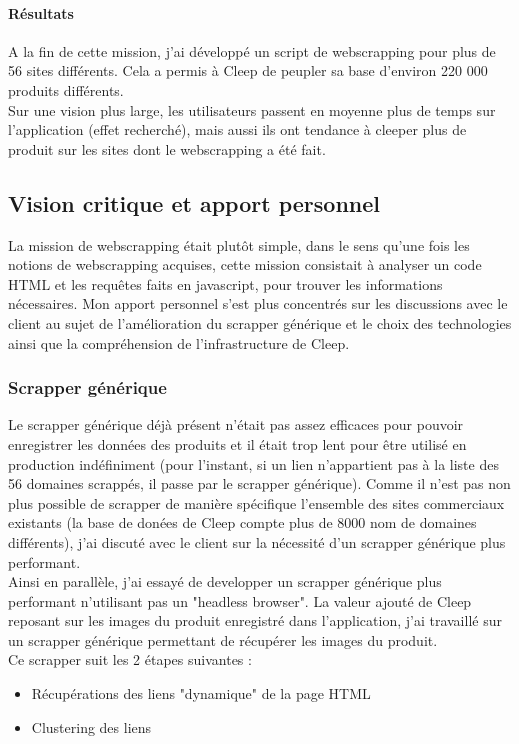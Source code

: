 \documentclass{article} %
\begin{document}
\paragraph{Résultats\\}
A la fin de cette mission, j'ai développé un script de webscrapping pour plus de 56 sites différents. Cela a permis à Cleep de peupler sa base d'environ 220 000 produits différents.\\
Sur une vision plus large, les utilisateurs passent en moyenne plus de temps sur l'application (effet recherché), mais aussi ils ont tendance à cleeper plus de produit sur les sites dont le webscrapping a été fait.

\subsection{Vision critique et apport personnel}

La mission de webscrapping était plutôt simple, dans le sens qu'une fois les notions de webscrapping acquises, cette mission consistait à analyser un code HTML et les requêtes faits en javascript, pour trouver les informations nécessaires. Mon apport personnel s'est plus concentrés sur les discussions avec le client au sujet de l'amélioration du scrapper générique et le choix des technologies ainsi que la compréhension de l'infrastructure de Cleep.

\subsubsection{Scrapper générique\\}
Le scrapper générique déjà présent n'était pas assez efficaces pour pouvoir enregistrer les données des produits et il était trop lent pour être utilisé en production indéfiniment (pour l'instant, si un lien n'appartient pas à la liste des 56 domaines scrappés, il passe par le scrapper générique). Comme il n'est pas non plus possible de scrapper de manière spécifique l'ensemble des sites commerciaux existants (la base de donées de Cleep compte plus de 8000 nom de domaines différents), j'ai discuté avec le client sur la nécessité d'un scrapper générique plus performant.\\
Ainsi en parallèle, j'ai essayé de developper un scrapper générique plus performant n'utilisant pas un "headless browser". La valeur ajouté de Cleep reposant sur les images du produit enregistré dans l'application, j'ai travaillé sur un scrapper générique permettant de récupérer les images du produit.\\
Ce scrapper suit les 2 étapes suivantes :
\begin{itemize}
	\itemsep 0em
	\item Récupérations des liens "dynamique" de la page HTML
	\item Clustering des liens
\end{itemize}
\end{document}
